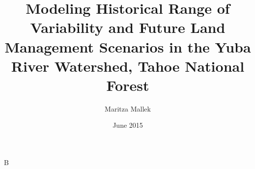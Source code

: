 \documentclass[12pt]{book}
\begin{document}
\author{Maritza Mallek}
\title{Modeling Historical Range of Variability and Future Land Management Scenarios in the Yuba River Watershed, Tahoe National Forest}
\date{June 2015}

%

\maketitle
\frontmatter 
\tableofcontents 
% 

\mainmatter 

 
 
 

 


\backmatter 
% 
% 
B
  
\end{document}
